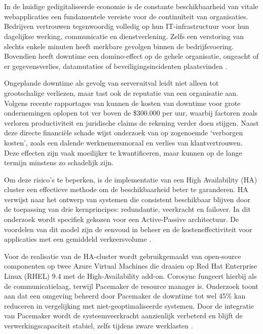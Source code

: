 
\chapter{}%
\label{ch:inleiding}

In de huidige gedigitaliseerde economie is de constante beschikbaarheid van vitale webapplicaties een fundamentele vereiste voor de continuïteit van organisaties. Bedrijven vertrouwen tegenwoordig volledig op hun IT-infrastructuur voor hun dagelijkse werking, communicatie en dienstverlening. Zelfs een verstoring van slechts enkele minuten heeft merkbare gevolgen binnen de bedrijfsvoering. Bovendien heeft downtime een domino-effect op de gehele organisatie, ongeacht of er gegevensverlies, datamutaties of beveiligingsincidenten plaatsvinden \autocite{ITIC2024}.
\medskip

Ongeplande downtime als gevolg van serveruitval leidt niet alleen tot grootschalige verliezen, maar tast ook de reputatie van een organisatie aan. Volgens recente rapportages van \textcite{ITIC2024} kunnen de kosten van downtime voor grote ondernemingen oplopen tot ver boven de \$300.000 per uur, waarbij factoren zoals verloren productiviteit en juridische claims de rekening verder doen stijgen. Naast deze directe financiële schade wijst onderzoek van \textcite{Kollective2025} op zogenoemde ‘verborgen kosten’, zoals een dalende werknemersmoraal en verlies van klantvertrouwen. Deze effecten zijn vaak moeilijker te kwantificeren, maar kunnen op de lange termijn minstens zo schadelijk zijn.
\medskip

Om deze risico's te beperken, is de implementatie van een High Availability (HA) cluster een effectieve methode om de beschikbaarheid beter te garanderen. HA verwijst naar het ontwerp van systemen die consistent beschikbaar blijven door de toepassing van drie kernprincipes: redundantie, veerkracht en failover. In dit onderzoek wordt specifiek gekozen voor een Active-Passive architectuur. De voordelen van dit model zijn de eenvoud in beheer en de kosteneffectiviteit voor applicaties met een gemiddeld verkeersvolume \autocite{Luca2024}.
\medskip

Voor de realisatie van de HA-cluster wordt gebruikgemaakt van open-source componenten op twee Azure Virtual Machines die draaien op Red Hat Enterprise Linux (RHEL) 9.4 met de High-Availability add-on. Corosync fungeert hierbij als de communicatielaag, terwijl Pacemaker de resource manager is. Onderzoek toont aan dat een omgeving beheerd door Pacemaker de downtime tot wel 45\% kan reduceren in vergelijking met niet-geoptimaliseerde systemen. Door de integratie van Pacemaker wordt de systeemveerkracht aanzienlijk verbeterd en blijft de verwerkingscapaciteit stabiel, zelfs tijdens zware werklasten \autocite{Mani2022}.

